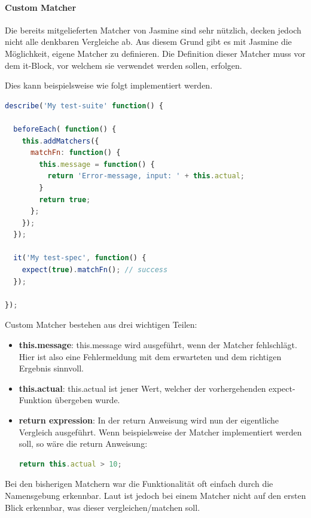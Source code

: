 \paragraph{Custom Matcher}
Die bereits mitgelieferten Matcher von Jasmine sind sehr nützlich, decken jedoch nicht alle denkbaren Vergleiche ab. Aus diesem Grund gibt es mit Jasmine die Möglichkeit, eigene Matcher zu definieren. Die Definition dieser Matcher muss vor dem it-Block, vor welchem sie verwendet werden sollen, erfolgen.

Dies kann beispielsweise wie folgt implementiert werden.

\begin{lstlisting}[language=JavaScript]
describe('My test-suite' function() {

  beforeEach( function() {
    this.addMatchers({
      matchFn: function() {
        this.message = function() {
          return 'Error-message, input: ' + this.actual;
        }
        return true;
      };
    });
  });

  it('My test-spec', function() {
    expect(true).matchFn(); // success
  });

});
\end{lstlisting}

Custom Matcher bestehen aus drei wichtigen Teilen:
\begin{itemize}
  \item \textbf{this.message}: \newline
  this.message wird ausgeführt, wenn der Matcher fehlschlägt. Hier ist also eine Fehlermeldung mit dem erwarteten und dem richtigen Ergebnis sinnvoll.
  \item \textbf{this.actual}: \newline
  this.actual ist jener Wert, welcher der vorhergehenden expect-Funktion übergeben wurde.
  \item \textbf{return expression}: \newline
  In der return Anweisung wird nun der eigentliche Vergleich ausgeführt. Wenn beispielsweise der Matcher  implementiert werden soll, so wäre die return Anweisung:
\begin{lstlisting}[language=JavaScript]
return this.actual > 10;
\end{lstlisting}

\end{itemize}


Bei den bisherigen Matchern war die Funktionalität oft einfach durch die Namensgebung erkennbar. Laut \cite[21]{Hahn:2013} ist jedoch bei einem Matcher nicht auf den ersten Blick erkennbar, was dieser vergleichen/matchen soll.

